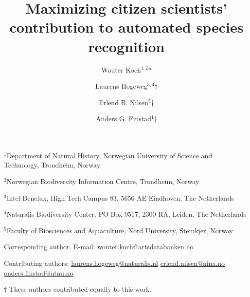 \documentclass{article}
\begin{document}
\title{Maximizing citizen scientists' contribution to automated species recognition}
\date{}
\author{
Wouter Koch\(^{1,2}\)*
\and
Laurens Hogeweg\(^{3,4}\)†
\and
Erlend B. Nilsen\(^{5}\)†
\and
Anders G. Finstad\(^1\)†}

\maketitle
\begin{center}
{\footnotesize \(^1\)Department of Natural History, Norwegian University of Science and Technology, Trondheim, Norway}

{\footnotesize \(^2\)Norwegian Biodiversity Information Centre, Trondheim, Norway}

{\footnotesize \(^3\)Intel Benelux, High Tech Campus 83, 5656 AE Eindhoven, The Netherlands}

{\footnotesize \(^4\)Naturalis Biodiversity Center, PO Box 9517, 2300 RA, Leiden, The Netherlands}

{\footnotesize \(^5\)Faculty of Biosciences and Aquaculture, Nord University, Steinkjer, Norway}




\center\parbox{200pt}{\normalsize\center *Corresponding author.
E-mail:
\href{mailto:wouter.koch@artsdatabanken.no}{wouter.koch@artsdatabanken.no}

Contributing authors:
\href{mailto:laurens.hogeweg@naturalis.nl}{laurens.hogeweg@naturalis.nl}
\href{mailto:erlend.nilsen@nina.no}{erlend.nilsen@nina.no}
\href{mailto:anders.finstad@ntnu.no}{anders.finstad@ntnu.no}}

\vspace{1cm}
\footnotesize{† These authors contributed equally to this work.}
\end{center}
\newpage
\justifying
\normalsize
\end{document}
